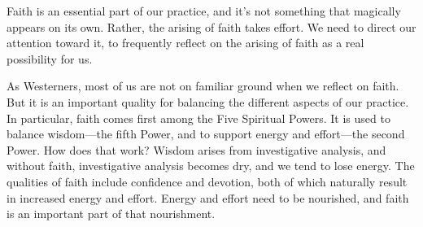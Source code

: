
Faith is an essential part of our practice, and it's not something that 
magically appears on its own. Rather, the arising of faith takes 
effort. We need to direct our attention toward it, to frequently 
reflect on the arising of faith as a real possibility for us.

As Westerners, most of us are not on familiar ground when we reflect on 
faith. But it is an important quality for balancing the different 
aspects of our practice. In particular, faith comes first among the 
Five Spiritual Powers. It is used to balance wisdom---the fifth Power, 
and to support energy and effort---the second Power. How does that 
work? Wisdom arises from investigative analysis, and without faith, 
investigative analysis becomes dry, and we tend to lose energy. The 
qualities of faith include confidence and devotion, both of which 
naturally result in increased energy and effort. Energy and effort need 
to be nourished, and faith is an important part of that nourishment.

